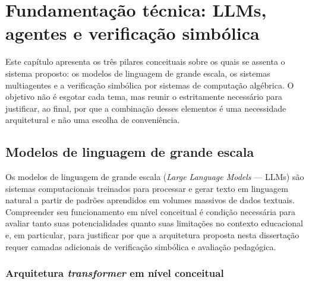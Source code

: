 \chapter{Fundamentação técnica: LLMs, agentes e verificação simbólica}
\label{cap:tecnica}

%

Este capítulo apresenta os três pilares conceituais sobre os quais se assenta o sistema proposto:
os modelos de linguagem de grande escala, os sistemas multiagentes e a verificação simbólica por
sistemas de computação algébrica. O objetivo não é esgotar cada tema, mas reunir o estritamente
necessário para justificar, ao final, por que a combinação desses elementos é uma necessidade
arquitetural e não uma escolha de conveniência.

\section{Modelos de linguagem de grande escala}
\label{sec:llm}

Os modelos de linguagem de grande escala (\emph{Large Language Models} --- LLMs) são sistemas
computacionais treinados para processar e gerar texto em linguagem natural a partir de padrões
aprendidos em volumes massivos de dados textuais. Compreender seu funcionamento em nível conceitual
é condição necessária para avaliar tanto suas potencialidades quanto suas limitações no contexto
educacional e, em particular, para justificar por que a arquitetura proposta nesta dissertação
requer camadas adicionais de verificação simbólica e avaliação pedagógica.

\subsection{Arquitetura \emph{transformer} em nível conceitual}
\label{sub:transformer}

